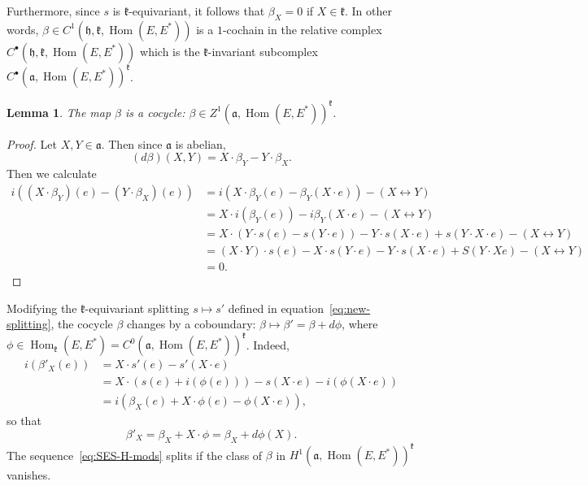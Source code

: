 \documentclass[11pt,reqno,a4paper,final]{amsart}
\theoremstyle{plain}
\newtheorem{lemma}{Lemma}
\theoremstyle{definition}
\newcommand{\h}{\mathfrak{h}}
\newcommand{\fa}{\mathfrak{a}}
\newcommand{\fk}{\mathfrak{k}}
\newcommand{\1}{\mathbb{1}}
\newcommand{\Hom}{\operatorname{Hom}}
\numberwithin{equation}{section}
\begin{document}
\begin{appendices}
Furthermore, since $s$ is $\fk$-equivariant, it follows that $\beta_X = 0$ if $X \in \fk$.  In other words, $\beta \in C^1(\h,\fk,\Hom(E,E^*))$ is a $1$-cochain in the relative complex $C^\bullet(\h,\fk,\Hom(E,E^*))$ which is the $\fk$-invariant subcomplex $C^\bullet(\fa,\Hom(E,E^*))^\fk$.

\begin{lemma}
  The map $\beta$ is a cocycle: $\beta \in Z^1(\fa, \Hom(E,E^*))^\fk$.
\end{lemma}

\begin{proof}
  Let $X,Y \in \fa$.  Then since $\fa$ is abelian,
  \begin{equation}
    (d\beta)(X,Y) = X \cdot \beta_Y - Y \cdot \beta_X.
  \end{equation}
  Then we calculate
  \begin{align*}
    i \left( (X \cdot \beta_Y)(e) - (Y \cdot \beta_X)(e)\right) &= i \left(  X \cdot \beta_Y (e) - \beta_Y(X \cdot e)\right) - (X \leftrightarrow Y)\\
                           &= X \cdot i (\beta_Y(e)) - i \beta_Y(X \cdot e) -  (X \leftrightarrow Y)\\
                           &= X \cdot (Y \cdot s(e) - s(Y \cdot e)) - Y \cdot s (X \cdot e) + s(Y \cdot X \cdot e) -  (X \leftrightarrow Y)\\
                           &= (X \cdot Y) \cdot s(e) - X \cdot s(Y \cdot e) - Y \cdot s(X \cdot e) + S(Y \cdot X e) - (X \leftrightarrow Y)\\
                           &= 0. & \tag{since $X \cdot Y = Y \cdot X$}
  \end{align*}
\end{proof}

Modifying the $\fk$-equivariant splitting $s \mapsto s'$ defined in
equation~\eqref{eq:new-splitting}, the cocycle $\beta$ changes by a
coboundary: $\beta \mapsto \beta' = \beta + d \phi$, where $\phi \in
\Hom_{\fk}(E,E^*) = C^0(\fa,\Hom(E,E^*))^\fk$.  Indeed,
\begin{align*}
  i (\beta'_X (e)) &= X \cdot s'(e) - s'(X \cdot e) \\
                  &= X \cdot (s(e) + i (\phi(e))) - s(X \cdot e) - i (\phi (X \cdot e))\\
                  &= i (\beta_X(e) + X \cdot \phi(e) - \phi(X \cdot e)),
\end{align*}
so that
\begin{equation}
  \beta'_X = \beta_X + X \cdot \phi = \beta_X + d\phi(X).
\end{equation}
The sequence~\eqref{eq:SES-H-mods} splits if the class of $\beta$ in
$H^1(\fa,\Hom(E,E^*))^\fk$ vanishes.


\end{appendices}
\end{document}
